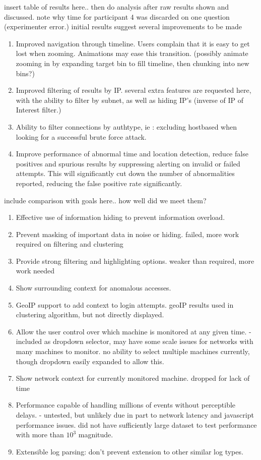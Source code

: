 insert table of results here.. then do analysis after raw results shown and discussed.
note why time for participant 4 was discarded on one question (experimenter error.)
initial results suggest several improvements to be made
\begin{enumerate}
\item{Improved navigation through timeline. Users complain that it is easy to get lost when zooming. Animations may ease this transition. (possibly animate zooming in by expanding target bin to fill timeline, then chunking into new bins?)}
\item{Improved filtering of results by IP. several extra features are requested here, with the ability to filter by subnet, as well as hiding IP's (inverse of IP of Interest filter.)}
\item{Ability to filter connections by authtype, ie : excluding hostbased when looking for a successful brute force attack.}
\item{Improve performance of abnormal time and location detection, reduce false positives and spurious results by suppressing alerting on invalid or failed attempts. This will significantly cut down the number of abnormalities reported, reducing the false positive rate significantly.}
\end{enumerate}

include comparison with goals here.. how well did we meet them?
\begin{enumerate}
\item{Effective use of information hiding to prevent information overload.}
\item{Prevent masking of important data in noise or hiding. failed, more work required on filtering and clustering}
\item{Provide strong filtering and highlighting options. weaker than required, more work needed}
\item{Show surrounding context for anomalous accesses.}
\item{GeoIP support to add context to login attempts. geoIP results used in clustering algorithm, but not directly displayed.}
\item{Allow the user control over which machine is monitored at any given time. -included as dropdown selector, may have some scale issues for networks with many machines to monitor. no ability to select multiple machines currently, though dropdown easily expanded to allow this.}
\item{Show network context for currently monitored machine. dropped for lack of time}
\item{Performance capable of handling millions of events without perceptible delays. - untested, but unlikely due in part to network latency and javascript performance issues. did not have sufficiently large dataset to test performance with more than $10^3$ magnitude.}
\item{Extensible log parsing: don't prevent extension to other similar log types.}
\end{enumerate}
